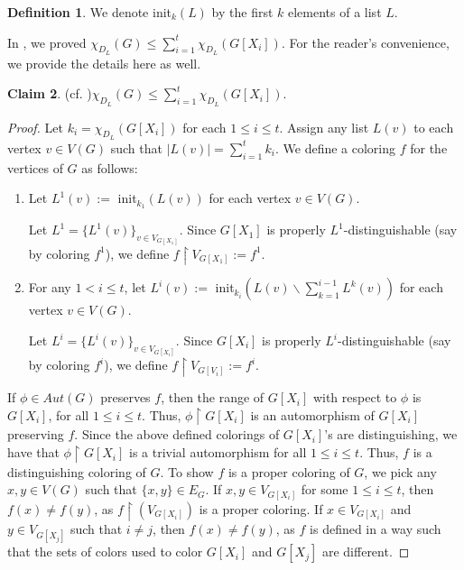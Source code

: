\documentclass[12pt,reqno,a4paper]{amsart}
\theoremstyle{definition}
\newtheorem{defn}{Definition}[section]
\newtheorem{claim}[defn]{Claim}
\begin{document}
\begin{defn}\label{Definition 3.4}
We denote init$_{k}(L)$ by the first $k$ elements of a list $L$.    
\end{defn}

In \cite[Claim 4.4]{BMG2025}, we proved 
$\chi_{D_{L}}(G)\leq \sum_{i=1}^{t} \chi_{D_{L}}(G[X_{i}])$. For the reader's convenience, we provide the details here as well.

\begin{claim}{(cf. \cite[Claim 4.4]{BMG2025})}\label{claim 3.5}
$\chi_{D_{L}}(G)\leq \sum_{i=1}^{t} \chi_{D_{L}}(G[X_{i}])$.
\end{claim}

\begin{proof}
Let $k_{i}=\chi_{D_{L}}(G[X_{i}])$ for each $1\leq i\leq t$. Assign any list $L(v)$ to each vertex $v \in V(G)$ such that $\vert L(v)\vert= \sum_{i=1}^{t}k_{i}$. We define a coloring $f$ for the vertices of $G$ as follows:

\begin{enumerate}
    \item Let $L^{1}(v):=$ init$_{k_{1}}(L(v))$ for each vertex $v\in V(G)$. 
    \vspace{2mm}
    
    Let $L^{1}=\{L^{1}(v)\}_{v\in V_{G[X_{1}]}}$. Since $G[X_{1}]$ is properly $L^{1}$-distinguishable (say by coloring $f^1$), we define $f\restriction V_{G[X_{1}]}:=f^{1}$.
    \vspace{2mm}
    
    \item For any $1<i\leq t$, let $L^{i}(v):=$ init$_{k_{i}}(L(v)\backslash \sum_{k= 1}^{i-1} L^{k}(v)) $ for each vertex $v\in V(G)$. 
    \vspace{2mm}
    
    Let $L^{i}=\{L^{i}(v)\}_{v\in V_{G[X_{i}]}}$. Since $G[X_{i}]$ is properly $L^{i}$-distinguishable (say by coloring $f^i$), we define $f\restriction V_{G[V_{i}]}:=f^{i}$.
\end{enumerate}  

If $\phi\in Aut(G)$ preserves $f$, then the range of $G[X_{i}]$ with respect to $\phi$ is $G[X_{i}]$, for all $1\leq i\leq t$. Thus, $\phi\restriction G[X_{i}]$ is an automorphism of $G[X_{i}]$ preserving $f$. Since the above defined colorings of $G[X_{i}]$'s are distinguishing, we have that $\phi\restriction G[X_{i}]$ is a trivial automorphism for all $1\leq i\leq t$. Thus, $f$ is a distinguishing coloring of $G$. 
To show $f$ is a proper coloring of $G$, we pick any $x,y\in V(G)$ such that $\{x,y\}\in E_{G}$. If $x,y\in V_{G[X_{i}]}$ for some $1\leq i\leq t$, then $f(x)\neq f(y)$, as $f\restriction (V_{G[X_{i}]})$ is a proper coloring. If $x\in V_{G[X_{i}]}$ and $y\in V_{G[X_{j}]}$ such that $i\neq j$, then $f(x)\neq f(y)$, as $f$ is defined in a way such that the sets of colors used to color $G[X_{i}]$ and $G[X_{j}]$ are different.
\end{proof} 
\end{document}
